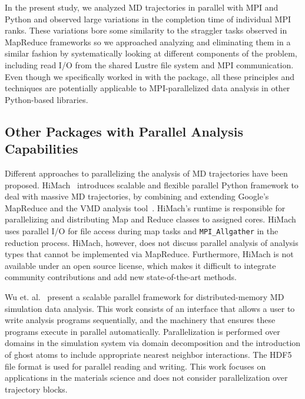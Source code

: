 In the present study, we analyzed MD trajectories in parallel with MPI and Python and observed large variations in the completion time of individual MPI ranks.
These variations bore some similarity to the straggler tasks observed in MapReduce frameworks so we approached analyzing and eliminating them in a similar fashion by systematically looking at different components of the problem, including read I/O from the shared Lustre file system and MPI communication.
Even though we specifically worked in with the  package, all these principles and techniques are potentially applicable to MPI-parallelized data analysis in other Python-based libraries.


\subsection{Other Packages with Parallel Analysis Capabilities}
\label{sec:otherparallel}

Different approaches to parallelizing the analysis of MD trajectories have been proposed.
HiMach~\cite{himach-2008} introduces scalable and flexible parallel Python framework to deal with massive MD trajectories, by combining and extending Google's MapReduce and the VMD analysis tool~\cite{Hum96}. 
HiMach's runtime is responsible for parallelizing and distributing Map and Reduce classes to assigned cores.
HiMach uses parallel I/O for file access during map tasks and \texttt{MPI\_Allgather} in the reduction process. 
HiMach, however, does not discuss parallel analysis of analysis types that cannot be implemented via MapReduce.
Furthermore, HiMach is not available under an open source license, which makes it difficult to integrate community contributions and add new state-of-the-art methods.

Wu et. al.~\cite{Wu_et.al} present a scalable parallel framework for distributed-memory MD simulation data analysis.
This work consists of an interface that allows a user to write analysis programs sequentially, and the machinery that ensures these programs execute in parallel automatically. 
Parallelization is performed over domains in the simulation system via domain decomposition and the introduction of ghost atoms to include appropriate nearest neighbor interactions.
The HDF5 file format is used for parallel reading and writing.
This work focuses on applications in the materials science and does not consider parallelization over trajectory blocks.

